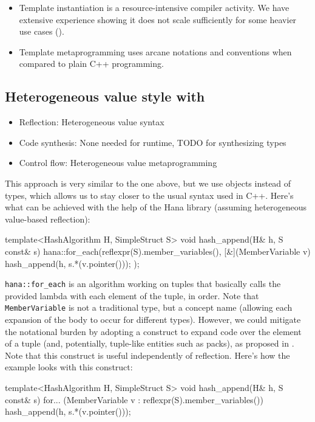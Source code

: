 \documentclass{wg21}
\newcommand{\cc}[1]{\texttt{#1}}
\begin{document}
\begin{itemize}
  \item Template instantiation is a resource-intensive compiler activity. We
        have extensive experience showing it does not scale sufficiently for
        some heavier use cases (\cite{Boost.MPL}).
  \item Template metaprogramming uses arcane notations and conventions when
        compared to plain C++ programming.
\end{itemize}


\subsection{Heterogeneous value style with \cite{P0590}}
\begin{itemize}
  \item Reflection: Heterogeneous value syntax
  \item Code synthesis: None needed for runtime, TODO for synthesizing types
  \item Control flow: Heterogeneous value metaprogramming
\end{itemize}

This approach is very similar to the one above, but we use objects instead of
types, which allows us to stay closer to the usual syntax used in C++. Here's
what can be achieved with the help of the Hana library (assuming heterogeneous
value-based reflection):

\begin{cpp}
template<HashAlgorithm H, SimpleStruct S>
void hash_append(H& h, S const& s) {
  hana::for_each(reflexpr(S).member_variables(), [&](MemberVariable v) {
    hash_append(h, s.*(v.pointer()));
  });
}
\end{cpp}

\cc{hana::for_each} is an algorithm working on tuples that basically calls the
provided lambda with each element of the tuple, in order. Note that
\cc{MemberVariable} is not a traditional type, but a concept name (allowing
each expansion of the body to occur for different types). However, we could
mitigate the notational burden by adopting a construct to expand code over the
element of a tuple (and, potentially, tuple-like entities such as packs), as
proposed in \cite{P0590}. Note that this construct is useful independently of
reflection. Here's how the example looks with this construct:

\begin{cpp}
template<HashAlgorithm H, SimpleStruct S>
void hash_append(H& h, S const& s) {
  for... (MemberVariable v : reflexpr(S).member_variables()) {
    hash_append(h, s.*(v.pointer()));
  }
}
\end{cpp}
\end{document}
